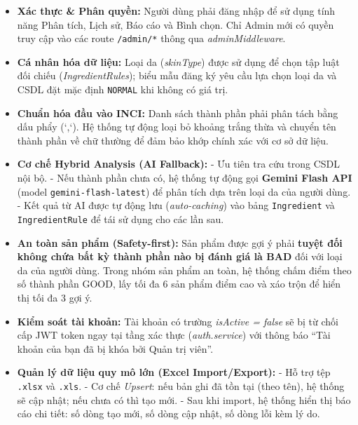 \documentclass[12pt,a4paper]{article}
\begin{document}
\begin{itemize}
    \item \textbf{Xác thực \& Phân quyền:} Người dùng phải đăng nhập để sử dụng tính năng Phân tích, Lịch sử, Báo cáo và Bình chọn. Chỉ Admin mới có quyền truy cập vào các route \texttt{/admin/*} thông qua \textit{adminMiddleware}.
    
    \item \textbf{Cá nhân hóa dữ liệu:} Loại da (\textit{skinType}) được sử dụng để chọn tập luật đối chiếu (\textit{IngredientRules}); biểu mẫu đăng ký yêu cầu lựa chọn loại da và CSDL đặt mặc định \texttt{NORMAL} khi không có giá trị.
    
    \item \textbf{Chuẩn hóa đầu vào INCI:} Danh sách thành phần phải phân tách bằng dấu phẩy (`,`). Hệ thống tự động loại bỏ khoảng trắng thừa và chuyển tên thành phần về chữ thường để đảm bảo khớp chính xác với cơ sở dữ liệu.
    
    \item \textbf{Cơ chế Hybrid Analysis (AI Fallback):}  
    - Ưu tiên tra cứu trong CSDL nội bộ.  
    - Nếu thành phần chưa có, hệ thống tự động gọi \textbf{Gemini Flash API} (model \texttt{gemini-flash-latest}) để phân tích dựa trên loại da của người dùng.  
    - Kết quả từ AI được tự động lưu (\textit{auto-caching}) vào bảng \texttt{Ingredient} và \texttt{IngredientRule} để tái sử dụng cho các lần sau.
    
    \item \textbf{An toàn sản phẩm (Safety-first):} Sản phẩm được gợi ý phải \textbf{tuyệt đối không chứa bất kỳ thành phần nào bị đánh giá là BAD} đối với loại da của người dùng. Trong nhóm sản phẩm an toàn, hệ thống chấm điểm theo số thành phần GOOD, lấy tối đa 6 sản phẩm điểm cao và xáo trộn để hiển thị tối đa 3 gợi ý.
    
    \item \textbf{Kiểm soát tài khoản:} Tài khoản có trường \textit{isActive = false} sẽ bị từ chối cấp JWT token ngay tại tầng xác thực (\textit{auth.service}) với thông báo “Tài khoản của bạn đã bị khóa bởi Quản trị viên”.
    
    \item \textbf{Quản lý dữ liệu quy mô lớn (Excel Import/Export):}  
    - Hỗ trợ tệp \texttt{.xlsx} và \texttt{.xls}.  
    - Cơ chế \textit{Upsert}: nếu bản ghi đã tồn tại (theo tên), hệ thống sẽ cập nhật; nếu chưa có thì tạo mới.  
    - Sau khi import, hệ thống hiển thị báo cáo chi tiết: số dòng tạo mới, số dòng cập nhật, số dòng lỗi kèm lý do.
    

\end{itemize}
\end{document}
